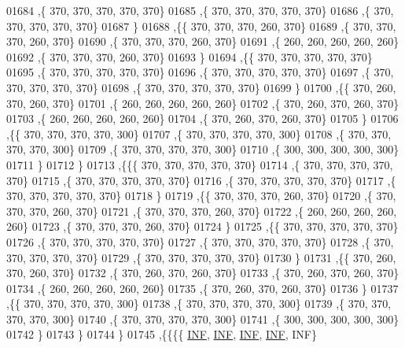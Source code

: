 \begin{DoxyCode}
01684    ,\{   370,   370,   370,   370,   370\}
01685    ,\{   370,   370,   370,   370,   370\}
01686    ,\{   370,   370,   370,   370,   370\}
01687    \}
01688   ,\{\{   370,   370,   370,   260,   370\}
01689    ,\{   370,   370,   370,   260,   370\}
01690    ,\{   370,   370,   370,   260,   370\}
01691    ,\{   260,   260,   260,   260,   260\}
01692    ,\{   370,   370,   370,   260,   370\}
01693    \}
01694   ,\{\{   370,   370,   370,   370,   370\}
01695    ,\{   370,   370,   370,   370,   370\}
01696    ,\{   370,   370,   370,   370,   370\}
01697    ,\{   370,   370,   370,   370,   370\}
01698    ,\{   370,   370,   370,   370,   370\}
01699    \}
01700   ,\{\{   370,   260,   370,   260,   370\}
01701    ,\{   260,   260,   260,   260,   260\}
01702    ,\{   370,   260,   370,   260,   370\}
01703    ,\{   260,   260,   260,   260,   260\}
01704    ,\{   370,   260,   370,   260,   370\}
01705    \}
01706   ,\{\{   370,   370,   370,   370,   300\}
01707    ,\{   370,   370,   370,   370,   300\}
01708    ,\{   370,   370,   370,   370,   300\}
01709    ,\{   370,   370,   370,   370,   300\}
01710    ,\{   300,   300,   300,   300,   300\}
01711    \}
01712   \}
01713  ,\{\{\{   370,   370,   370,   370,   370\}
01714    ,\{   370,   370,   370,   370,   370\}
01715    ,\{   370,   370,   370,   370,   370\}
01716    ,\{   370,   370,   370,   370,   370\}
01717    ,\{   370,   370,   370,   370,   370\}
01718    \}
01719   ,\{\{   370,   370,   370,   260,   370\}
01720    ,\{   370,   370,   370,   260,   370\}
01721    ,\{   370,   370,   370,   260,   370\}
01722    ,\{   260,   260,   260,   260,   260\}
01723    ,\{   370,   370,   370,   260,   370\}
01724    \}
01725   ,\{\{   370,   370,   370,   370,   370\}
01726    ,\{   370,   370,   370,   370,   370\}
01727    ,\{   370,   370,   370,   370,   370\}
01728    ,\{   370,   370,   370,   370,   370\}
01729    ,\{   370,   370,   370,   370,   370\}
01730    \}
01731   ,\{\{   370,   260,   370,   260,   370\}
01732    ,\{   370,   260,   370,   260,   370\}
01733    ,\{   370,   260,   370,   260,   370\}
01734    ,\{   260,   260,   260,   260,   260\}
01735    ,\{   370,   260,   370,   260,   370\}
01736    \}
01737   ,\{\{   370,   370,   370,   370,   300\}
01738    ,\{   370,   370,   370,   370,   300\}
01739    ,\{   370,   370,   370,   370,   300\}
01740    ,\{   370,   370,   370,   370,   300\}
01741    ,\{   300,   300,   300,   300,   300\}
01742    \}
01743   \}
01744  \}
01745 ,\{\{\{\{   \hyperlink{energy__const_8h_a12c2040f25d8e3a7b9e1c2024c618cb6}{INF},   \hyperlink{energy__const_8h_a12c2040f25d8e3a7b9e1c2024c618cb6}{INF},   \hyperlink{energy__const_8h_a12c2040f25d8e3a7b9e1c2024c618cb6}{INF},   \hyperlink{energy__const_8h_a12c2040f25d8e3a7b9e1c2024c618cb6}{INF},   INF\}

\end{DoxyCode}
